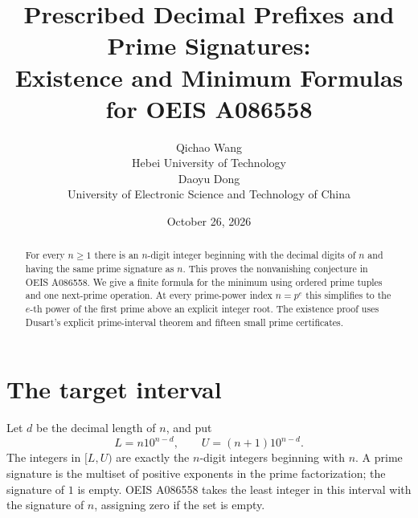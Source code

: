 \documentclass[10pt]{article}
\title{Prescribed Decimal Prefixes and Prime Signatures:\\Existence and Minimum Formulas for OEIS A086558}
\author{Qichao Wang\\{\small Hebei University of Technology}\\[0.3em]
Daoyu Dong\\{\small University of Electronic Science and Technology of China}}
\date{October 26, 2026}
\begin{document}
\maketitle
\begin{abstract}
For every $n\ge1$ there is an $n$-digit integer beginning with the decimal
digits of $n$ and having the same prime signature as $n$. This proves the
nonvanishing conjecture in OEIS A086558. We give a finite formula for the
minimum using ordered prime tuples and one next-prime operation. At every
prime-power index $n=p^e$ this simplifies to the $e$-th power of the first
prime above an explicit integer root. The existence proof uses Dusart's
explicit prime-interval theorem and fifteen small prime certificates.
\end{abstract}
\small

\section{The target interval}
Let $d$ be the decimal length of $n$, and put
\begin{equation}\label{eq:LU}
 L=n10^{n-d},\qquad U=(n+1)10^{n-d}.
\end{equation}
The integers in $[L,U)$ are exactly the $n$-digit integers beginning
with $n$. A prime signature is the multiset of positive exponents in
the prime factorization; the signature of $1$ is empty.
OEIS A086558 \cite{oeis} takes the least integer in this interval with
the signature of $n$, assigning zero if the set is empty.
\end{document}
